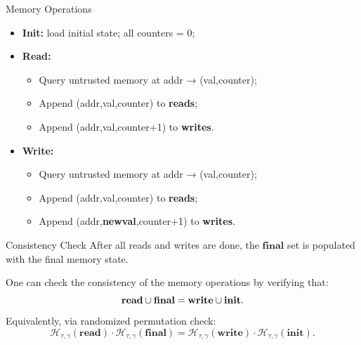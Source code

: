 \documentclass{zkdl-presentation-template}
\begin{document}
    \begin{frame}{Memory Operations}
        \begin{itemize}
            \item \textbf{Init:} load initial state; all counters = 0;  
            \item \textbf{Read:}  
            \begin{itemize}
                \item Query untrusted memory at \textsf{addr} → \textsf{(val,counter)};  
                \item Append \textsf{(addr,val,counter)} to \textbf{reads};
                \item Append \textsf{(addr,val,counter+1)} to \textbf{writes}.
            \end{itemize}
            \item \textbf{Write:} 
            \begin{itemize}
                \item Query untrusted memory at \textsf{addr} → \textsf{(val,counter)};  
                \item Append \textsf{(addr,val,counter)} to \textbf{reads};
                \item Append \textsf{(addr,\textbf{newval},counter+1)} to \textbf{writes}.
            \end{itemize}
        \end{itemize}
    \end{frame}

    \begin{frame}{Consistency Check}
        After all reads and writes are done, the $\mathbf{final}$ set is populated with the final memory state. 

        \begin{lemma}
            One can check the consistency of the memory operations by verifying that:
            \begin{equation*}
                \mathbf{read} \cup \mathbf{final} = \mathbf{write} \cup \mathbf{init}.
                \vspace{-5px}
            \end{equation*}
            Equivalently, via randomized permutation check:
            \vspace{-5px}
            \begin{equation*}
                \mathcal{H}_{\tau,\gamma}(\mathbf{read}) \cdot \mathcal{H}_{\tau,\gamma}(\mathbf{final}) = 
                \mathcal{H}_{\tau,\gamma}(\mathbf{write}) \cdot \mathcal{H}_{\tau,\gamma}(\mathbf{init}).
            \end{equation*}
        \end{lemma}
    \end{frame}
\end{document}
